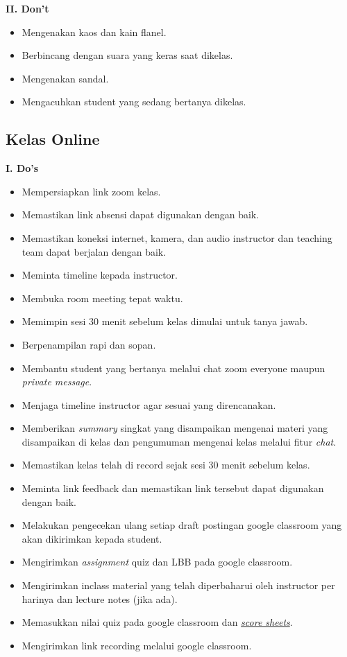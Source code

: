 \documentclass[
]{book}
\providecommand{\tightlist}{%
  \setlength{\itemsep}{0pt}\setlength{\parskip}{0pt}}
\begin{document}
\textbf{II. Don't}

\begin{itemize}
\tightlist
\item
  Mengenakan kaos dan kain flanel.
\item
  Berbincang dengan suara yang keras saat dikelas.
\item
  Mengenakan sandal.
\item
  Mengacuhkan student yang sedang bertanya dikelas.
\end{itemize}

\hypertarget{kelas-online-4}{%
\subsection{Kelas Online}\label{kelas-online-4}}

\textbf{I. Do's}

\begin{itemize}
\tightlist
\item
  Mempersiapkan link zoom kelas.
\item
  Memastikan link absensi dapat digunakan dengan baik.
\item
  Memastikan koneksi internet, kamera, dan audio instructor dan teaching team dapat berjalan dengan baik.
\item
  Meminta timeline kepada instructor.
\item
  Membuka room meeting tepat waktu.
\item
  Memimpin sesi 30 menit sebelum kelas dimulai untuk tanya jawab.
\item
  Berpenampilan rapi dan sopan.
\item
  Membantu student yang bertanya melalui chat zoom everyone maupun \emph{private message}.
\item
  Menjaga timeline instructor agar sesuai yang direncanakan.
\item
  Memberikan \emph{summary} singkat yang disampaikan mengenai materi yang disampaikan di kelas dan pengumuman mengenai kelas melalui fitur \emph{chat}.
\item
  Memastikan kelas telah di record sejak sesi 30 menit sebelum kelas.
\item
  Meminta link feedback dan memastikan link tersebut dapat digunakan dengan baik.
\item
  Melakukan pengecekan ulang setiap draft postingan google classroom yang akan dikirimkan kepada student.
\item
  Mengirimkan \emph{assignment} quiz dan LBB pada google classroom.
\item
  Mengirimkan inclass material yang telah diperbaharui oleh instructor per harinya dan lecture notes (jika ada).
\item
  Memasukkan nilai quiz pada google classroom dan \href{https://docs.google.com/spreadsheets/d/1cGJ0pn9k9gKCBnceWVwaL9D7BBDMNjLh8uPYlaBlJi8/edit\#gid=1518964141}{\emph{score sheets}}.
\item
  Mengirimkan link recording melalui google classroom.
\end{itemize}
\end{document}
